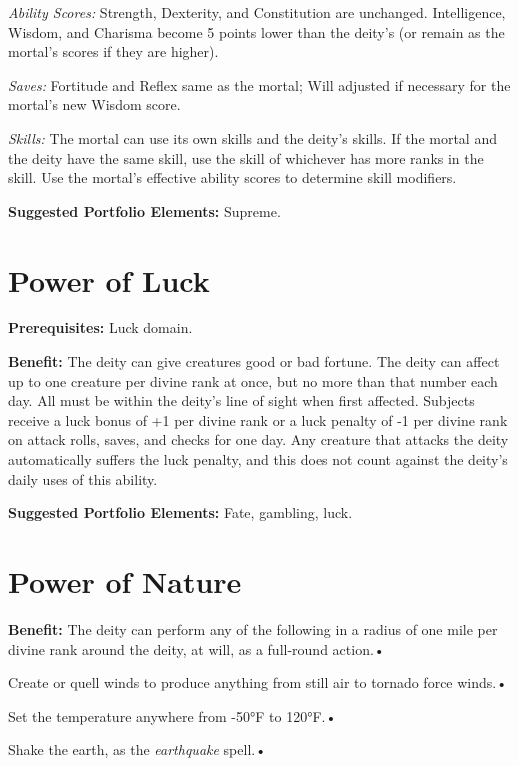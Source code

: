\documentclass{article}
\begin{document}
\textit{Ability Scores: }Strength, Dexterity, and Constitution are unchanged. Intelligence, 
Wisdom, and Charisma become 5 points lower than the deity's (or remain as the mortal's 
scores if they are higher).

\textit{Saves: }Fortitude and Reflex same as the mortal; Will adjusted if necessary 
for the mortal's new Wisdom score.

\textit{Skills: }The mortal can use its own skills and the deity's skills. If the 
mortal and the deity have the same skill, use the skill of whichever has more ranks 
in the skill. Use the mortal's effective ability scores to determine skill modifiers.

\textbf{Suggested Portfolio Elements:} Supreme.

\vspace{12pt}
\section*{Power of Luck}

\textbf{Prerequisites:} Luck domain.

\textbf{Benefit:} The deity can give creatures good or bad fortune. The deity can 
affect up to one creature per divine rank at once, but no more than that number 
each day. All must be within the deity's line of sight when first affected. Subjects 
receive a luck bonus of +1 per divine rank or a luck penalty of -1 per divine rank 
on attack rolls, saves, and checks for one day. Any creature that attacks the deity 
automatically suffers the luck penalty, and this does not count against the deity's 
daily uses of this ability.

\textbf{Suggested Portfolio Elements:} Fate, gambling, luck.

\vspace{12pt}
\section*{Power of Nature}

\textbf{Benefit:} The deity can perform any of the following in a radius of one 
mile per divine rank around the deity, at will, as a full-round action.• 

\parindent=3pt
Create or quell winds to produce anything from still air to tornado force winds.• 

Set the temperature anywhere from -50°F to 120°F.• 

\parindent=7pt
Shake the earth, as the \textit{earthquake }spell.• 
\end{document}
